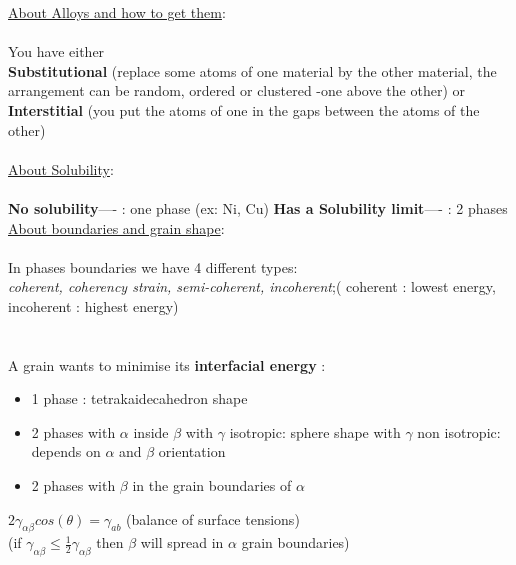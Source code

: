 \documentclass{summary_notes}
\begin{document}
\underline{About Alloys and how to get them}:\\
\\
You have either\\

\textbf{Substitutional} (replace some atoms of one material by the other material, the arrangement can be random, ordered or clustered -one above the other) or \\
\textbf{Interstitial} (you put the atoms of one in the gaps between the atoms of the other)\\
\\
\underline{About Solubility}:\\
\\
\textbf{No solubility}---- : one phase (ex: Ni, Cu)
\textbf{Has a Solubility limit}---- : 2 phases 
\\

% 
% 
 
 \underline{About boundaries and grain shape}:\\
\\
In phases boundaries we have 4 different types:  \\
\textit{coherent, coherency strain, semi-coherent, incoherent};(
coherent : lowest energy, incoherent : highest energy)\\
\\
\vspace{0.75cm}
\\
A grain wants to minimise its \textbf{interfacial energy} :
\begin{itemize}
\item 1 phase : tetrakaidecahedron shape
\item 2 phases with $\alpha$ inside $\beta$
\subitem with $\gamma$ isotropic: sphere shape
\subitem with $\gamma$ non isotropic: depends on $\alpha$ and $\beta$ orientation
\item 2 phases with $\beta$ in the grain boundaries of $\alpha$
\end{itemize}

     \centering   $2\gamma_{\alpha \beta}cos(\theta) = \gamma_{ab}$ (balance of surface tensions) \\
     
(if $\gamma_{\alpha \beta} \leq \frac{1}{2}\gamma_{\alpha \beta}$ then $\beta$ will spread in $\alpha$ grain boundaries)
\end{document}

